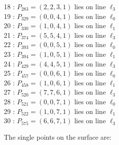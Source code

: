 \documentclass{article}
\begin{document}
{\begin{multicols}{2}
18 : $P_{283}=( 2, 2, 3, 1 )$ lies on line $\ell_{3}$\\
19 : $P_{329}=( 0, 0, 4, 1 )$ lies on line $\ell_{0}$\\
20 : $P_{330}=( 1, 0, 4, 1 )$ lies on line $\ell_{1}$\\
21 : $P_{374}=( 5, 5, 4, 1 )$ lies on line $\ell_{3}$\\
22 : $P_{393}=( 0, 0, 5, 1 )$ lies on line $\ell_{0}$\\
23 : $P_{394}=( 1, 0, 5, 1 )$ lies on line $\ell_{1}$\\
24 : $P_{429}=( 4, 4, 5, 1 )$ lies on line $\ell_{3}$\\
25 : $P_{457}=( 0, 0, 6, 1 )$ lies on line $\ell_{0}$\\
26 : $P_{458}=( 1, 0, 6, 1 )$ lies on line $\ell_{1}$\\
27 : $P_{520}=( 7, 7, 6, 1 )$ lies on line $\ell_{3}$\\
28 : $P_{521}=( 0, 0, 7, 1 )$ lies on line $\ell_{0}$\\
29 : $P_{522}=( 1, 0, 7, 1 )$ lies on line $\ell_{1}$\\
30 : $P_{575}=( 6, 6, 7, 1 )$ lies on line $\ell_{3}$\\
\end{multicols}
The single points on the surface are:\\
}
\end{document}

